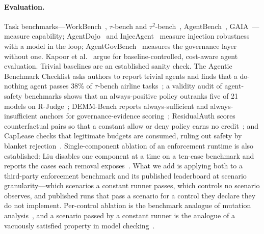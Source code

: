 \paragraph{Evaluation.} Task benchmarks---WorkBench~\cite{styles2024workbench}, $\tau$-bench and $\tau^2$-bench~\cite{yao2025taubench,barres2025tau2bench}, AgentBench~\cite{liu2024agentbench}, GAIA~\cite{mialon2024gaia}---measure capability; AgentDojo~\cite{debenedetti2024agentdojo} and InjecAgent~\cite{zhan2024injecagent} measure injection robustness with a model in the loop; AgentGovBench~\cite{agentgovbench} measures the governance layer without one. Kapoor et al.~\cite{kapoor2024agents} argue for baseline-controlled, cost-aware agent evaluation. Trivial baselines are an established sanity check. The Agentic Benchmark Checklist asks authors to report trivial agents and finds that a do-nothing agent passes 38\% of $\tau$-bench airline tasks~\cite{zhu2025abc}; a validity audit of agent-safety benchmarks shows that an always-positive policy outranks five of 21 models on R-Judge~\cite{wang2026validityaudit}; DEMM-Bench reports always-sufficient and always-insufficient anchors for governance-evidence scoring~\cite{solozobov2026demmbench}; ResidualAuth scores counterfactual pairs so that a constant allow or deny policy earns no credit~\cite{choi2026residualauth}; and CapLease checks that legitimate budgets are consumed, ruling out safety by blanket rejection~\cite{xu2026caplease}. Single-component ablation of an enforcement runtime is also established: Liu disables one component at a time on a ten-case benchmark and reports the cases each removal exposes~\cite{liu2026mcpinvariants}. What we add is applying both to a third-party enforcement benchmark and its published leaderboard at scenario granularity---which scenarios a constant runner passes, which controls no scenario observes, and published runs that pass a scenario for a control they declare they do not implement. Per-control ablation is the benchmark analogue of mutation analysis~\cite{jia2011mutation}, and a scenario passed by a constant runner is the analogue of a vacuously satisfied property in model checking~\cite{beer2001vacuity}.

